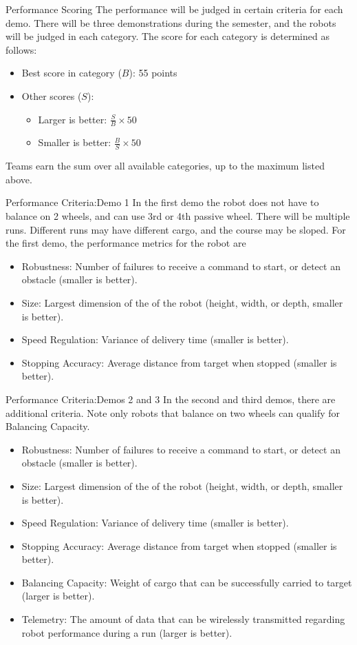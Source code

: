 \begin{frame}{Performance Scoring}
The performance will be judged in certain criteria for each demo. There will be three demonstrations during the semester, and the robots will be judged in each category. The score for each category is determined as follows:
\begin{itemize}
\item Best score in category ($B$): 55 points
\item Other scores ($S$):
\begin{itemize}
\item Larger is better: $\frac{S}{B}\times 50$
\item Smaller is better: $\frac{B}{S}\times 50$
\end{itemize}
\end{itemize}
Teams earn the sum over all available categories, up to the maximum listed above.
\end{frame}

\begin{frame}{Performance Criteria:}{Demo 1}
In the first demo the robot does not have to balance on 2 wheels, and can use 3rd or 4th passive wheel. There will be multiple runs. Different runs may have different cargo, and the course may be sloped. For the first demo, the performance metrics for the robot are 
\begin{itemize}
\item Robustness: Number of failures to receive a command to start, or detect an obstacle (smaller is better).
\item Size: Largest dimension of the of the robot (height, width, or depth, smaller is better).
\item Speed Regulation: Variance of delivery time (smaller is better).
\item Stopping Accuracy: Average distance from target when stopped (smaller is better).
\end{itemize}
\end{frame}

\begin{frame}{Performance Criteria:}{Demos 2 and 3}
In the second and third demos, there are additional criteria. Note only robots that balance on two wheels can qualify for Balancing Capacity. 
\begin{itemize}
\item Robustness: Number of failures to receive a command to start, or detect an obstacle (smaller is better).
\item Size: Largest dimension of the of the robot (height, width, or depth, smaller is better).
\item Speed Regulation: Variance of delivery time (smaller is better).
\item Stopping Accuracy: Average distance from target when stopped (smaller is better).
\item Balancing Capacity: Weight of cargo that can be successfully carried to target (larger is better).
\item Telemetry: The amount of data that can be wirelessly transmitted regarding robot performance during a run (larger is better).
\end{itemize}
\end{frame}


